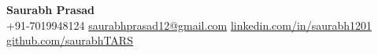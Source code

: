 \documentclass[letterpaper,10.99pt]{article}
\newcommand{\customHeading}[1]{%
\fontfamily{phv}\selectfont\Huge #1
}
\begin{document}
\begin{center}
\textbf{\customHeading{Saurabh Prasad}} \\
\small \faPhone \hspace{0.5em} +91-7019948124 \hspace{1em}
\faEnvelope \hspace{0.5em} \href{[mailto:saurabhprasad12@email.com](mailto:saurabhprasad12@email.com)}{saurabhprasad12@gmail.com} \hspace{1em}
\faLinkedin \hspace{0.5em} \href{https://linkedin.com/in/saurabh1201}{linkedin.com/in/saurabh1201} \hspace{1em}
\faGithub \hspace{0.5em} \href{https://github.com/saurabhTARS}{github.com/saurabhTARS}
\end{center}
\end{document}
